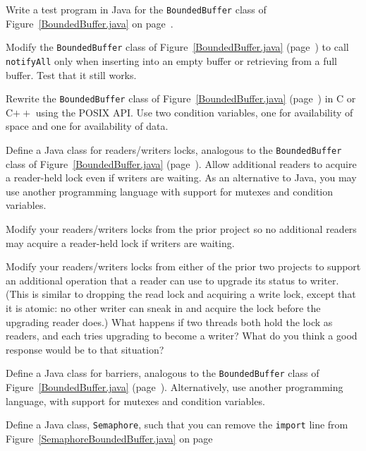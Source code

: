 \begin{chapterEnumerate}
Write a test program in Java for the \verb|BoundedBuffer| class of
Figure~\ref{BoundedBuffer.java} on page~\pageref{BoundedBuffer.java}.
\item\label{conditional-notifyAll-project}
Modify the \verb|BoundedBuffer| class of Figure~\ref{BoundedBuffer.java}
(page~\pageref{BoundedBuffer.java}) to call \verb|notifyAll| only when
inserting into an empty buffer or retrieving from a full buffer.  Test
that it still works.
\item\label{bb-two-condvars-project}
Rewrite the \verb|BoundedBuffer| class of Figure~\ref{BoundedBuffer.java} 
(page~\pageref{BoundedBuffer.java}) in C or C$++$ using the POSIX
API.  Use two condition variables, one for availability of space and
one for availability of data.
\item\label{rw-project}
Define a Java class for readers/writers locks, analogous to the
\verb|Bounded|\linebreak[0]\verb|Buffer| class of Figure~\ref{BoundedBuffer.java}
(page~\pageref{BoundedBuffer.java}).  Allow additional readers to
acquire a reader-held lock even if writers are waiting. As an
alternative to Java, you may use another programming language with
support for mutexes and condition variables.
\item
Modify your readers/writers locks from the prior project so no
additional readers may acquire a reader-held lock if writers are
waiting.
\item
\label{rwlock-with-upgrade-exercise}
Modify your readers/writers locks from either of the prior two projects
to support an additional operation that a reader can use to upgrade its
status to writer.  (This is similar to dropping the read lock and
acquiring a write lock, except that it is atomic: no other writer can
sneak in and acquire the lock before the upgrading reader does.)  What
happens if two threads both hold the lock as readers, and each tries
upgrading to become a writer?  What do you think a good response would
be to that situation?
\item\label{barrier-project}
Define a Java class for barriers, analogous to the
\verb|BoundedBuffer| class of Figure~\ref{BoundedBuffer.java}
(page~\pageref{BoundedBuffer.java}).  Alternatively, use another programming
language, with support for mutexes and condition variables.
\item\label{semaphore-project}
Define a Java class, \texttt{Semaphore}, such that
you can remove the \texttt{import} line from
Figure~\ref{SemaphoreBoundedBuffer.java} on
page~\pageref{SemaphoreBoundedBuffer.java}

\end{chapterEnumerate}
